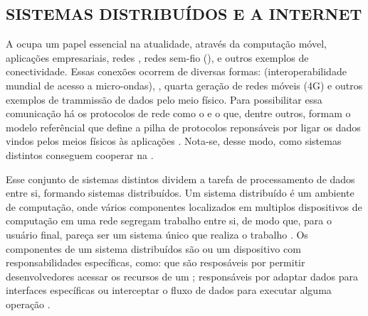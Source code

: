 \subsection{SISTEMAS DISTRIBUÍDOS E A INTERNET}

A  ocupa um papel essencial na atualidade, através da computação móvel, aplicações empresariais, redes , redes sem-fio (), e outros exemplos de conectividade. Essas conexões ocorrem de diversas formas:  (interoperabilidade mundial de acesso a micro-ondas), , quarta geração de redes móveis (4G) e outros exemplos de trammissão de dados pelo meio físico. Para possibilitar essa comunicação há os protocolos de rede como o  e o  que, dentre outros, formam o modelo referêncial  que define a pilha de protocolos reponsáveis por ligar os dados vindos pelos meios físicos às aplicações \cite{alberti2016distributedsystemsfutureinternet}. Nota-se, desse modo, como sistemas distintos conseguem cooperar na .

Esse conjunto de sistemas distintos dividem a tarefa de processamento de dados entre si, formando sistemas distribuídos. Um sistema distribuído é um ambiente de computação, onde vários componentes localizados em multiplos dispositivos de computação em uma rede segregam trabalho entre si, de modo que, para o usuário final, pareça ser um sistema único que realiza o trabalho \cite{khole2023compendium}. Os componentes de um sistema distribuídos são  ou um dispositivo com responsabilidades específicas, como:  que são resposáveis por permitir desenvolvedores acessar os recursos de um  \cite{efuntade2023api};  responsáveis por adaptar dados para interfaces específicas ou interceptar o fluxo de dados para executar alguma operação \cite{tanenbaum2007dist}. 

